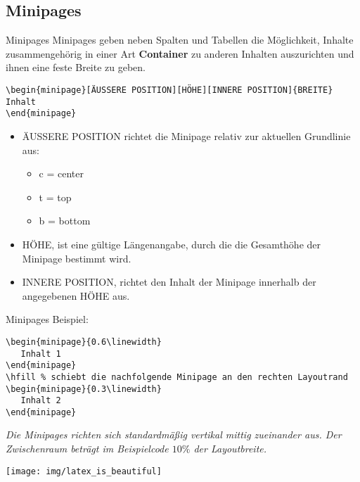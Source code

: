 \subsection{Minipages}
\begin{frame}[fragile]{Minipages}
Minipages geben neben Spalten und Tabellen die Möglichkeit, Inhalte zusammengehörig in einer Art \textbf{Container} zu anderen Inhalten auszurichten und ihnen eine feste Breite zu geben.
\begin{lstlisting}[style=tex]
\begin{minipage}[ÄUSSERE POSITION][HÖHE][INNERE POSITION]{BREITE}
Inhalt
\end{minipage}\end{lstlisting}
\begin{itemize}
\item ÄUSSERE POSITION richtet die Minipage relativ zur aktuellen Grundlinie aus:
\begin{itemize}
\item c = center
\item t = top
\item b = bottom \newline
\end{itemize}
\item HÖHE, ist eine gültige Längenangabe, durch die die Gesamthöhe der Minipage bestimmt wird. \newline
\item INNERE POSITION, richtet den Inhalt der Minipage innerhalb der angegebenen HÖHE aus.
\end{itemize}
\end{frame}

\begin{frame}[fragile]{Minipages}
Beispiel:
\begin{lstlisting}[style=tex]
\begin{minipage}{0.6\linewidth}
   Inhalt 1
\end{minipage}
\hfill % schiebt die nachfolgende Minipage an den rechten Layoutrand
\begin{minipage}{0.3\linewidth}
   Inhalt 2
\end{minipage}
\end{lstlisting}

\begin{minipage}{0.7\linewidth}
\itshape Die Minipages richten sich standardmäßig vertikal mittig zueinander aus. Der Zwischenraum beträgt im Beispielcode $10\%$ der Layoutbreite.
\end{minipage}
\hfill 
\begin{minipage}{0.25\linewidth}
   \texttt{[image: img/latex\_is\_beautiful]}
\end{minipage}
\end{frame}